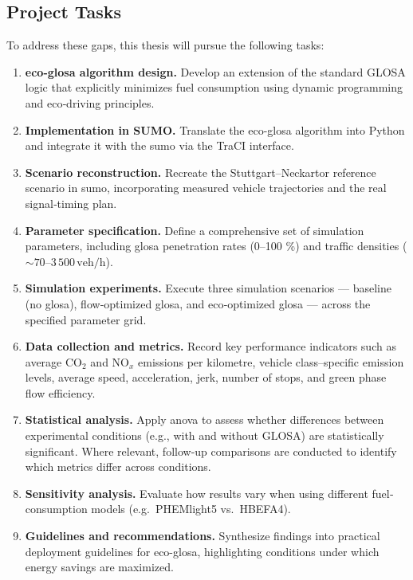 \subsection{Project Tasks}
\label{subsec:Project_Tasks}
To address these gaps, this thesis will pursue the following tasks:
\begin{enumerate}
  \item \textbf{\ac{eco-glosa} algorithm design.}  Develop an extension of the standard GLOSA logic that explicitly minimizes fuel consumption using dynamic programming and eco‐driving principles.
  \item \textbf{Implementation in SUMO.}  Translate the \ac{eco-glosa} algorithm into Python and integrate it with the \ac{sumo} via the TraCI interface.
  \item \textbf{Scenario reconstruction.}  Recreate the Stuttgart–Neckartor reference scenario in \ac{sumo}, incorporating measured vehicle trajectories and the real signal‐timing plan.
  \item \textbf{Parameter specification.}  Define a comprehensive set of simulation parameters, including \ac{glosa} penetration rates (0–100 \%) and traffic densities (\(\sim70\text{--}3\,500\,\text{veh/h}\)).
  \item \textbf{Simulation experiments.}  Execute three simulation scenarios --- baseline (no \ac{glosa}), flow‐optimized \ac{glosa}, and eco‐optimized \ac{glosa} --- across the specified parameter grid.
  \item \textbf{Data collection and metrics.}  Record key performance indicators such as average CO$_2$ and NO$_x$ emissions per kilometre, vehicle class–specific emission levels, average speed, acceleration, jerk, number of stops, and green phase flow efficiency.
  \item \textbf{Statistical analysis.} Apply \ac{anova} to assess whether differences between experimental conditions (e.g., with and without GLOSA) are statistically significant. Where relevant, follow-up comparisons are conducted to identify which metrics differ across conditions.
  \item \textbf{Sensitivity analysis.}  Evaluate how results vary when using different fuel‐consumption models (e.g.\ PHEMlight5 vs.\ HBEFA4).
  \item \textbf{Guidelines and recommendations.}  Synthesize findings into practical deployment guidelines for \ac{eco-glosa}, highlighting conditions under which energy savings are maximized.
\end{enumerate}
